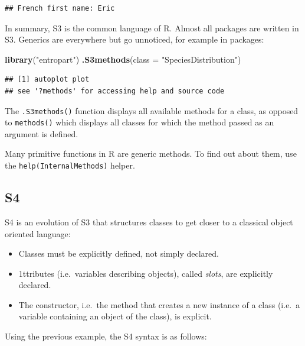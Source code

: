 \documentclass[
  12pt,
  american,
  a4paper,
  extrafontsizes,onecolumn,openright
  ]{memoir}
\newenvironment{Shaded}{\begin{snugshade}}{\end{snugshade}}
\newcommand{\AttributeTok}[1]{\textcolor[rgb]{0.13,0.29,0.53}{#1}}
\newcommand{\FunctionTok}[1]{\textcolor[rgb]{0.13,0.29,0.53}{\textbf{#1}}}
\newcommand{\NormalTok}[1]{#1}
\newcommand{\StringTok}[1]{\textcolor[rgb]{0.31,0.60,0.02}{#1}}
\providecommand{\tightlist}{%
  \setlength{\itemsep}{0pt}\setlength{\parskip}{0pt}}
\begin{document}
\begin{verbatim}
## French first name: Eric
\end{verbatim}

\normalsize

In summary, S3 is the common language of R.
Almost all packages are written in S3.
Generics are everywhere but go unnoticed, for example in packages:

\scriptsize

\begin{Shaded}
\begin{Highlighting}[]
\FunctionTok{library}\NormalTok{(}\StringTok{"entropart"}\NormalTok{)}
\FunctionTok{.S3methods}\NormalTok{(}\AttributeTok{class =} \StringTok{"SpeciesDistribution"}\NormalTok{)}
\end{Highlighting}
\end{Shaded}

\begin{verbatim}
## [1] autoplot plot    
## see '?methods' for accessing help and source code
\end{verbatim}

\normalsize

The \texttt{.S3methods()} function displays all available methods for a class, as opposed to \texttt{methods()} which displays all classes for which the method passed as an argument is defined.

Many primitive functions in R are generic methods.
To find out about them, use the \texttt{help(InternalMethods)} helper.

\subsection{S4}\label{s4}

S4 is an evolution of S3 that structures classes to get closer to a classical object oriented language:

\begin{itemize}
\tightlist
\item
  Classes must be explicitly defined, not simply declared.
\item
  1ttributes (i.e.~variables describing objects), called \emph{slots}, are explicitly declared.
\item
  The constructor, i.e.~the method that creates a new instance of a class (i.e.~a variable containing an object of the class), is explicit.
\end{itemize}

Using the previous example, the S4 syntax is as follows:
\end{document}
